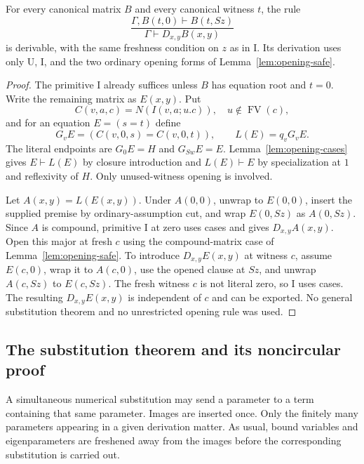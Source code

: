 \begin{lemma}
\label{lem:opening-case-repair}
For every canonical matrix $B$ and every canonical witness $t$, the rule
\[
 \frac{\Gamma,B(t,0)\vdash B(t,Sz)}
      {\Gamma\vdash D_{x,y}B(x,y)}
\]
is derivable, with the same freshness condition on $z$ as in I. Its
derivation uses only U, I, and the two ordinary opening forms of
Lemma~\ref{lem:opening-safe}.
\end{lemma}
\begin{proof}
The primitive I already suffices unless $B$ has equation root and $t=0$.
Write the remaining matrix as $E(x,y)$. Put
\[
 C(v,a,c)=N(I(v,a;u.c)),\quad u\notin\operatorname{FV}(c),
\]
and for an equation $E=(s=t)$ define
\[
 G_vE=(C(v,0,s)=C(v,0,t)),\qquad L(E)=q_vG_vE.
\]
The literal endpoints are $G_0E=H$ and $G_{Sw}E=E$.
Lemma~\ref{lem:opening-cases} gives $E\vdash L(E)$ by closure
introduction and $L(E)\vdash E$ by specialization at $1$ and reflexivity
of $H$. Only unused-witness opening is involved.

Let $A(x,y)=L(E(x,y))$. Under $A(0,0)$, unwrap to $E(0,0)$, insert the
supplied premise by ordinary-assumption cut, and wrap $E(0,Sz)$ as
$A(0,Sz)$. Since $A$ is compound, primitive I at zero uses cases and
gives $D_{x,y}A(x,y)$. Open this major at fresh $c$ using the
compound-matrix case of Lemma~\ref{lem:opening-safe}. To introduce
$D_{x,y}E(x,y)$ at witness $c$, assume $E(c,0)$, wrap it to $A(c,0)$,
use the opened clause at $Sz$, and unwrap $A(c,Sz)$ to $E(c,Sz)$.
The fresh witness $c$ is not literal zero, so I uses cases. The resulting
$D_{x,y}E(x,y)$ is independent of $c$ and can be exported. No general
substitution theorem and no unrestricted opening rule was used.
\end{proof}

\subsection{The substitution theorem and its noncircular proof}

A simultaneous numerical substitution may send a parameter to a term
containing that same parameter. Images are inserted once. Only the finitely
many parameters appearing in a given derivation matter. As usual, bound
variables and eigenparameters are freshened away from the images before
the corresponding substitution is carried out.

